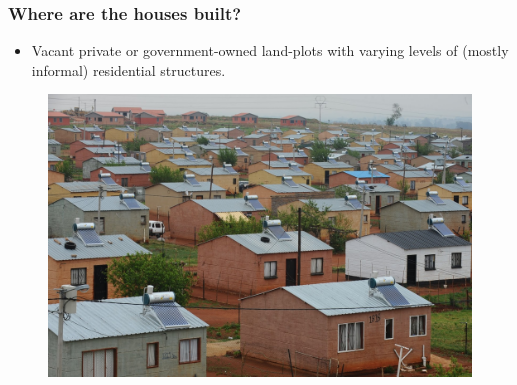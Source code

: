 \documentclass[aspectratio=32]{beamer}
\begin{document}

\begin{frame}
\frametitle{Where are the houses built?}

\begin{itemize}
  \item Vacant private or government-owned land-plots with varying levels of (mostly informal) residential structures. 
\end{itemize}

\begin{figure}
 \includegraphics[scale=.125]{figures/rdp_houses.jpg} 
\end{figure}

\end{frame}
\end{document}
